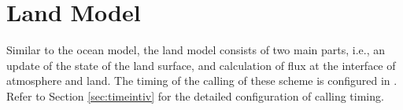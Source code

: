 %
%

\section{Land Model} \label{sec:basic_usel_land}
Similar to the ocean model, the land model consists of two main parts, i.e., an update of the state of the land surface, and calculation of flux at the interface of atmosphere and land. The timing of the calling of these scheme is configured in . Refer to Section \ref{sec:timeintiv} for the detailed configuration of calling timing.

